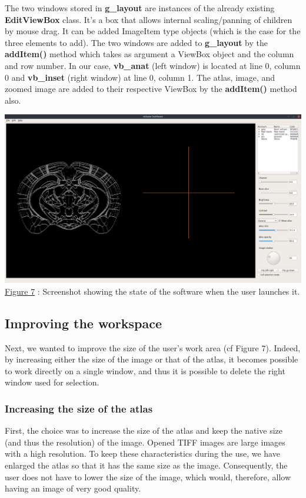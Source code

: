 \documentclass[a4paper,12pt]{report}
\begin{document}
The two windows stored in \textbf{g\_layout} are instances of the already existing \textbf{EditViewBox} class. It's a box that allows internal scaling/panning of children by mouse drag. It can be added ImageItem type objects (which is the case for the three elements to add). The two windows are added to \textbf{g\_layout} by the \textbf{addItem()} method which takes as argument a ViewBox object and the column and row number. In our case, \textbf{vb\_anat} (left window) is located at line 0, column 0 and \textbf{vb\_inset} (right window) at line 0, column 1. The atlas, image, and zoomed image are added to their respective ViewBox by the \textbf{addItem()} method also.\\

\begin{center} \includegraphics[scale=0.22]{newOpenSoftware.png}\\
\underline{Figure 7} : Screenshot showing the state of the software when the user launches it. \vspace{1\baselineskip}\\ \end{center}

\subsection{Improving the workspace}
Next, we wanted to improve the size of the user's work area (cf Figure 7). Indeed, by increasing either the size of the image or that of the atlas, it becomes possible to work directly on a single window, and thus it is possible to delete the right window used for selection.\\
\subsubsection{Increasing the size of the atlas}
First, the choice was to increase the size of the atlas and keep the native size (and thus the resolution) of the image. Opened TIFF images are large images with a high resolution. To keep these characteristics during the use, we have enlarged the atlas so that it has the same size as the image. Consequently, the user does not have to lower the size of the image, which would, therefore, allow having an image of very good quality.\\
\end{document}
